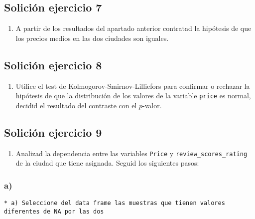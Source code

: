 \documentclass[
]{article}
\providecommand{\tightlist}{%
  \setlength{\itemsep}{0pt}\setlength{\parskip}{0pt}}
\begin{document}
\hypertarget{soliciuxf3n-ejercicio-7}{%
\subsection{Solición ejercicio 7}\label{soliciuxf3n-ejercicio-7}}

\begin{enumerate}
\def\labelenumi{\arabic{enumi}.}
\setcounter{enumi}{6}
\tightlist
\item
  A partir de los resultados del apartado anterior contratad la
  hipótesis de que los precios medios en las dos ciudades son iguales.
\end{enumerate}

\hypertarget{soliciuxf3n-ejercicio-8}{%
\subsection{Solición ejercicio 8}\label{soliciuxf3n-ejercicio-8}}

\begin{enumerate}
\def\labelenumi{\arabic{enumi}.}
\setcounter{enumi}{7}
\tightlist
\item
  Utilice el test de Kolmogorov-Smirnov-Lilliefors para confirmar o
  rechazar la hipótesis de que la distribución de los valores de la
  variable \texttt{price} es normal, decidid el resultado del contraste
  con el \(p\)-valor.
\end{enumerate}

\hypertarget{soliciuxf3n-ejercicio-9}{%
\subsection{Solición ejercicio 9}\label{soliciuxf3n-ejercicio-9}}

\begin{enumerate}
\def\labelenumi{\arabic{enumi}.}
\setcounter{enumi}{8}
\tightlist
\item
  Analizad la dependencia entre las variables \texttt{Price} y
  \texttt{review\_scores\_rating} de la ciudad que tiene asignada.
  Seguid los siguientes pasos:
\end{enumerate}

\hypertarget{a}{%
\subsubsection{a)}\label{a}}

\begin{verbatim}
* a) Seleccione del data frame las muestras que tienen valores diferentes de NA por las dos
\end{verbatim}
\end{document}
